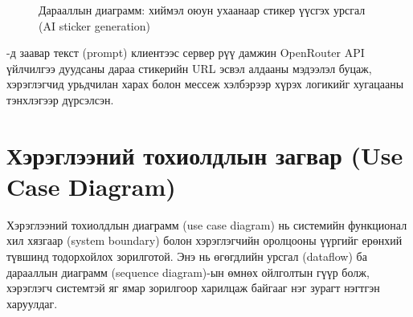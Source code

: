 \begin{figure}[H]
\centering
{}
\caption{Дарааллын диаграмм: хиймэл оюун ухаанаар стикер үүсгэх урсгал (AI sticker generation)}
\label{fig:seq_sticker}
\end{figure}

\noindent {}-д заавар текст (prompt) клиентээс сервер рүү дамжин OpenRouter API үйлчилгээ дуудсаны дараа стикерийн URL эсвэл алдааны мэдээлэл буцаж, хэрэглэгчид урьдчилан харах болон мессеж хэлбэрээр хүрэх логикийг хугацааны тэнхлэгээр дүрсэлсэн.

\section{Хэрэглээний тохиолдлын загвар (Use Case Diagram)}

Хэрэглээний тохиолдлын диаграмм (use case diagram) нь системийн функционал хил хязгаар (system boundary) болон хэрэглэгчийн оролцооны үүргийг ерөнхий түвшинд тодорхойлох зорилготой. Энэ нь өгөгдлийн урсгал (dataflow) ба дарааллын диаграмм (sequence diagram)-ын өмнөх ойлголтын гүүр болж, хэрэглэгч системтэй яг ямар зорилгоор харилцаж байгааг нэг зурагт нэгтгэн харуулдаг.

